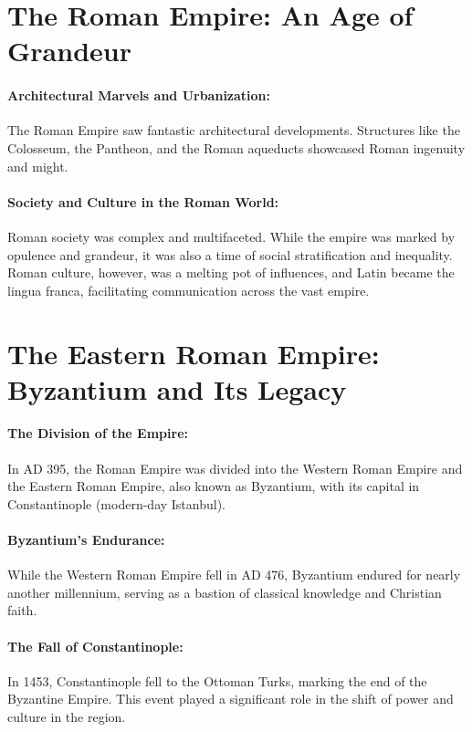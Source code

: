 \documentclass{book}
\begin{document}
\section*{The Roman Empire: An Age of Grandeur}

\paragraph{Architectural Marvels and Urbanization:}
The Roman Empire saw fantastic architectural developments. Structures like the Colosseum, the Pantheon, and the Roman aqueducts showcased Roman ingenuity and might.

\paragraph{Society and Culture in the Roman World:}
Roman society was complex and multifaceted. While the empire was marked by opulence and grandeur, it was also a time of social stratification and inequality. Roman culture, however, was a melting pot of influences, and Latin became the lingua franca, facilitating communication across the vast empire.

\section*{The Eastern Roman Empire: Byzantium and Its Legacy}

\paragraph{The Division of the Empire:}
In AD 395, the Roman Empire was divided into the Western Roman Empire and the Eastern Roman Empire, also known as Byzantium, with its capital in Constantinople (modern-day Istanbul).

\paragraph{Byzantium’s Endurance:}
While the Western Roman Empire fell in AD 476, Byzantium endured for nearly another millennium, serving as a bastion of classical knowledge and Christian faith.

\paragraph{The Fall of Constantinople:}
In 1453, Constantinople fell to the Ottoman Turks, marking the end of the Byzantine Empire. This event played a significant role in the shift of power and culture in the region.
\end{document}
